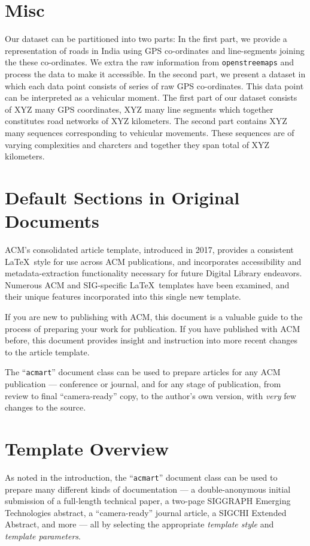 \documentclass[sigplan,screen]{acmart}
\begin{document}
\section{Misc}

Our dataset can be partitioned into two parts:
In the first part, we provide a representation of roads in India
using GPS co-ordinates and line-segments joining the 
these co-ordinates.
We extra the raw information from \texttt{openstreemaps}
and process the data to make it accessible.
In the second part, we present a dataset 
in which each data point consists of series 
of raw GPS co-ordinates.
This data point can be interpreted as a vehicular moment. 
The first part of our dataset consists of XYZ many GPS coordinates,
XYZ many line segments which together constitutes road networks
of XYZ kilometers.
The second part contains XYZ many sequences corresponding
to vehicular movements.
These sequences are of varying complexities and charcters
and together they span total of XYZ kilometers. 


\iffalse

\newpage

\section{Default Sections in Original Documents}

ACM's consolidated article template, introduced in 2017, provides a
consistent \LaTeX\ style for use across ACM publications, and
incorporates accessibility and metadata-extraction functionality
necessary for future Digital Library endeavors. Numerous ACM and
SIG-specific \LaTeX\ templates have been examined, and their unique
features incorporated into this single new template.

If you are new to publishing with ACM, this document is a valuable
guide to the process of preparing your work for publication. If you
have published with ACM before, this document provides insight and
instruction into more recent changes to the article template.

The ``\verb|acmart|'' document class can be used to prepare articles
for any ACM publication --- conference or journal, and for any stage
of publication, from review to final ``camera-ready'' copy, to the
author's own version, with {\itshape very} few changes to the source.

\section{Template Overview}
As noted in the introduction, the ``\verb|acmart|'' document class can
be used to prepare many different kinds of documentation --- a
double-anonymous initial submission of a full-length technical paper, a
two-page SIGGRAPH Emerging Technologies abstract, a ``camera-ready''
journal article, a SIGCHI Extended Abstract, and more --- all by
selecting the appropriate {\itshape template style} and {\itshape
  template parameters}.
\end{document}

